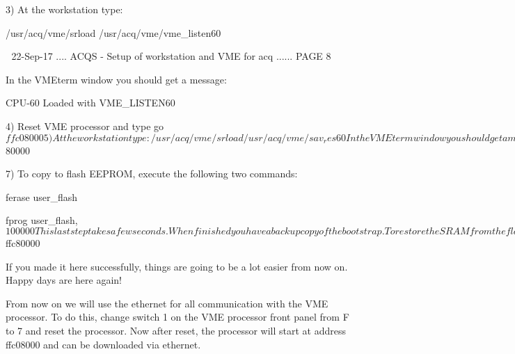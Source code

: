        3) At the workstation type:
 
          /usr/acq/vme/srload /usr/acq/vme/vme_listen60
 
    
   22-Sep-17 .... ACQS  - Setup of workstation and VME for acq ...... PAGE   8
 
          In the VMEterm window you should get a message:
 
          CPU-60 Loaded with VME_LISTEN60
 
       4) Reset VME processor and type  go $ffc08000
 
       5) At the workstation type:
 
          /usr/acq/vme/srload /usr/acq/vme/sav_res60
 
          In the VMEterm window you should get a message:
 
          CPU-60 Loaded with SAV_RES60
 
       6) Reset VME processor and type  go $80000
 
       7) To copy to flash EEPROM, execute the following two commands:
 
          ferase user_flash
 
          fprog user_flash,$100000
 
 
   This  last  step takes a few seconds.  When finished you have a backup copy
   of the bootstrap.
 
   To restore the SRAM from the flash EEPROM,
 
          go $ffc80000
 
   If you made it here successfully, things are going to be a lot easier  from
   now on.  Happy days are here again!
 
   From  now  on  we  will use the ethernet for all communication with the VME
   processor.  To do this, change switch 1 on the  VME  processor  front panel
   from  F  to  7 and reset the processor. Now after reset, the processor will
   start at address ffc08000 and can be downloaded via ethernet.
